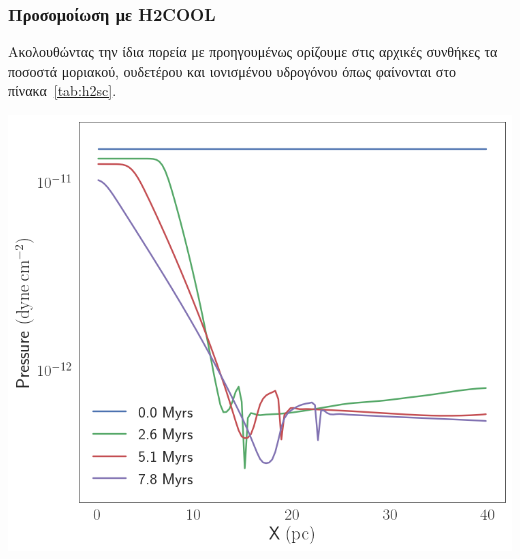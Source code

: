 	\subsubsection{Προσομοίωση με H2COOL}

	Ακολουθώντας την ίδια πορεία με προηγουμένως ορίζουμε στις αρχικές συνθήκες τα ποσοστά μοριακού, ουδετέρου και ιονισμένου υδρογόνου όπως φαίνονται στο πίνακα~\ref{tab:h2sc}.
	
	\begin{marginfigure}
		\centering
		\includegraphics[width=1\linewidth]{DataImages/H2CoolingPRSprofile}
		\caption{}
		\label{fig:h2coolingprsprofile}
	\end{marginfigure}
	
